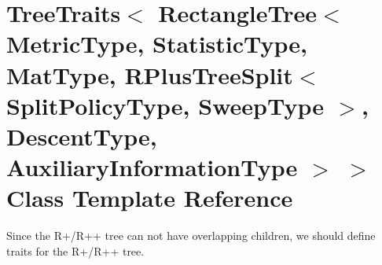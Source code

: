 \section{Tree\+Traits$<$ Rectangle\+Tree$<$ Metric\+Type, Statistic\+Type, Mat\+Type, R\+Plus\+Tree\+Split$<$ Split\+Policy\+Type, Sweep\+Type $>$, Descent\+Type, Auxiliary\+Information\+Type $>$ $>$ Class Template Reference}
\label{classmlpack_1_1tree_1_1TreeTraits_3_01RectangleTree_3_01MetricType_00_01StatisticType_00_01MatTyd3300c6b7e2f56d4c1027298545eb7bf}


Since the R+/\+R++ tree can not have overlapping children, we should define traits for the R+/\+R++ tree.  



